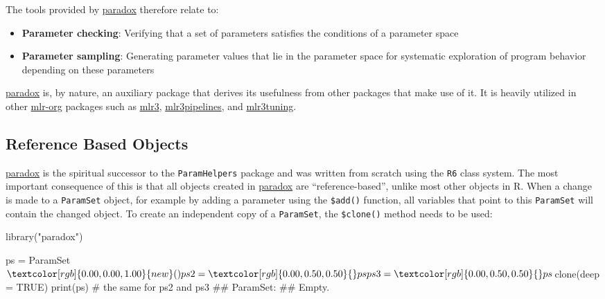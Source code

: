 \documentclass[
  11pt,
  parskip=half,
  DIV=calc,
  BCOR=10mm,
  x11names]{scrbook}
\newenvironment{Shaded}{}{}
\newcommand{\CommentTok}[1]{\textcolor[rgb]{0.00,0.50,0.00}{#1}}
\newcommand{\DataTypeTok}[1]{#1}
\newcommand{\KeywordTok}[1]{\textcolor[rgb]{0.00,0.00,1.00}{#1}}
\newcommand{\NormalTok}[1]{#1}
\newcommand{\OperatorTok}[1]{#1}
\newcommand{\OtherTok}[1]{\textcolor[rgb]{1.00,0.25,0.00}{#1}}
\newcommand{\StringTok}[1]{\textcolor[rgb]{0.00,0.50,0.50}{#1}}
\providecommand{\tightlist}{%
  \setlength{\itemsep}{0pt}\setlength{\parskip}{0pt}}
\begin{document}
The tools provided by \href{https://paradox.mlr-org.com}{paradox} therefore relate to:

\begin{itemize}
\tightlist
\item
  \textbf{Parameter checking}: Verifying that a set of parameters satisfies the conditions of a parameter space
\item
  \textbf{Parameter sampling}: Generating parameter values that lie in the parameter space for systematic exploration of program behavior depending on these parameters
\end{itemize}

\href{https://paradox.mlr-org.com}{paradox} is, by nature, an auxiliary package that derives its usefulness from other packages that make use of it.
It is heavily utilized in other \href{https://github.com/mlr-org}{mlr-org} packages such as \href{https://mlr3.mlr-org.com}{mlr3}, \href{https://mlr3pipelines.mlr-org.com}{mlr3pipelines}, and \href{https://mlr3tuning.mlr-org.com}{mlr3tuning}.

\hypertarget{reference-based-objects}{%
\subsection{Reference Based Objects}\label{reference-based-objects}}

\href{https://paradox.mlr-org.com}{paradox} is the spiritual successor to the \texttt{ParamHelpers} package and was written from scratch using the \texttt{R6} class system.
The most important consequence of this is that all objects created in \href{https://paradox.mlr-org.com}{paradox} are ``reference-based'', unlike most other objects in R.
When a change is made to a \texttt{ParamSet} object, for example by adding a parameter using the \texttt{\$add()} function, all variables that point to this \texttt{ParamSet} will contain the changed object.
To create an independent copy of a \texttt{ParamSet}, the \texttt{\$clone()} method needs to be used:

\begin{Shaded}
\begin{Highlighting}[]
\KeywordTok{library}\NormalTok{(}\StringTok{"paradox"}\NormalTok{)}

\NormalTok{ps =}\StringTok{ }\NormalTok{ParamSet}\OperatorTok{$}\KeywordTok{new}\NormalTok{()}
\NormalTok{ps2 =}\StringTok{ }\NormalTok{ps}
\NormalTok{ps3 =}\StringTok{ }\NormalTok{ps}\OperatorTok{$}\KeywordTok{clone}\NormalTok{(}\DataTypeTok{deep =} \OtherTok{TRUE}\NormalTok{)}
\KeywordTok{print}\NormalTok{(ps)  }\CommentTok{# the same for ps2 and ps3}
\NormalTok{## ParamSet: }
\NormalTok{## Empty.}
\end{Highlighting}
\end{Shaded}
\end{document}
